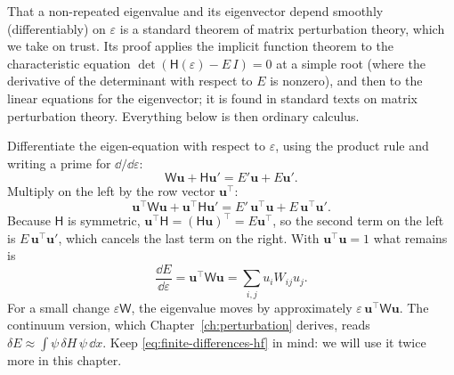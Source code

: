\begin{beyond}
That a non-repeated eigenvalue and its eigenvector depend smoothly (differentiably) on $\varepsilon$ is a standard theorem of matrix perturbation theory, which we take on trust. Its proof applies the implicit function theorem to the characteristic equation $\det(\mathsf H(\varepsilon)-E\,I)=0$ at a simple root (where the derivative of the determinant with respect to $E$ is nonzero), and then to the linear equations for the eigenvector; it is found in standard texts on matrix perturbation theory. Everything below is then ordinary calculus.
\end{beyond}

Differentiate the eigen-equation with respect to $\varepsilon$, using the product rule and writing a prime for $\dd/\dd\varepsilon$:
\begin{equation*}
\mathsf W\mathbf u+\mathsf H\mathbf u'=E'\mathbf u+E\mathbf u'.
\end{equation*}
Multiply on the left by the row vector $\mathbf u^\top$:
\begin{equation*}
\mathbf u^\top\mathsf W\mathbf u+\mathbf u^\top\mathsf H\mathbf u'=E'\,\mathbf u^\top\mathbf u+E\,\mathbf u^\top\mathbf u'.
\end{equation*}
Because $\mathsf H$ is symmetric, $\mathbf u^\top\mathsf H=(\mathsf H\mathbf u)^\top=E\mathbf u^\top$, so the second term on the left is $E\,\mathbf u^\top\mathbf u'$, which cancels the last term on the right. With $\mathbf u^\top\mathbf u=1$ what remains is
\begin{equation}
\boxed{\;\frac{\dd E}{\dd\varepsilon}=\mathbf u^\top\mathsf W\mathbf u=\sum_{i,j}u_iW_{ij}u_j.\;}
\label{eq:finite-differences-hf}
\end{equation}
For a small change $\varepsilon\mathsf W$, the eigenvalue moves by approximately $\varepsilon\,\mathbf u^\top\mathsf W\mathbf u$. The continuum version, which Chapter~\ref{ch:perturbation} derives, reads $\delta E\approx\int\psi\,\delta H\,\psi\,\dd x$. Keep \eqref{eq:finite-differences-hf} in mind: we will use it twice more in this chapter.

